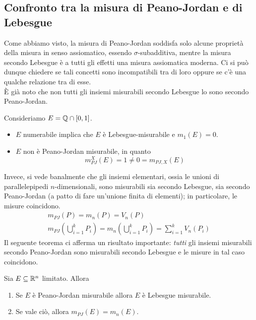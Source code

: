 \subsection{Confronto tra la misura di Peano-Jordan e di Lebesgue}
Come abbiamo visto, la misura di Peano-Jordan soddisfa solo alcune proprietà della misura in senso assiomatico, essendo $\sigma$-subadditiva, mentre la misura secondo Lebesgue è a tutti gli effetti una misura assiomatica moderna. Ci si può dunque chiedere se tali concetti sono incompatibili tra di loro oppure se c'è una qualche relazione tra di esse.\\
È già noto che non tutti gli insiemi misurabili secondo Lebesgue lo sono secondo Peano-Jordan.
\begin{example}
	Consideriamo $E=\mathbb{Q}\cap\left[0,1\right]$.
	\begin{itemize}
		\item $E$ numerabile implica che $E$ è Lebesgue-misurabile e $m_1\left(E\right)=0$.
		\item $E$ non è Peano-Jordan misurabile, in quanto
		\begin{equation*}
			m_{PJ}^{X}\left(E\right)=1\neq 0=m_{PJ,X}\left(E\right)
		\end{equation*}
	\end{itemize}
\end{example}
Invece, si vede banalmente che gli insiemi elementari, ossia le unioni di parallelepipedi $n$-dimensionali, sono misurabili sia secondo Lebesgue, sia secondo Peano-Jordan (a patto di fare un'unione finita di elementi); in particolare, le misure coincidono.
\begin{gather*}
	m_{PJ}\left(P\right)=m_n\left(P\right)=V_n\left(P\right)\\
	m_{PJ}\left(\bigcup_{i=1}^{k}P_i\right)=m_n\left(\bigcup_{i=1}^{k}P_i\right)=\sum_{i=1}^{k}V_n\left(P_i\right)
\end{gather*}
Il seguente teorema ci afferma un risultato importante: \textit{tutti} gli insiemi misurabili secondo Peano-Jordan sono misurabili secondo Lebesgue e le misure in tal caso coincidono.
\begin{theorema}
	Sia $E\subseteq\mathbb{R}^n$ limitato. Allora
	\begin{enumerate}
		\item Se $E$ è Peano-Jordan misurabile allora $E$ è Lebesgue misurabile.
		\item Se vale ciò, allora $m_{PJ}\left(E\right)=m_n\left(E\right)$.
	\end{enumerate}
\end{theorema}
